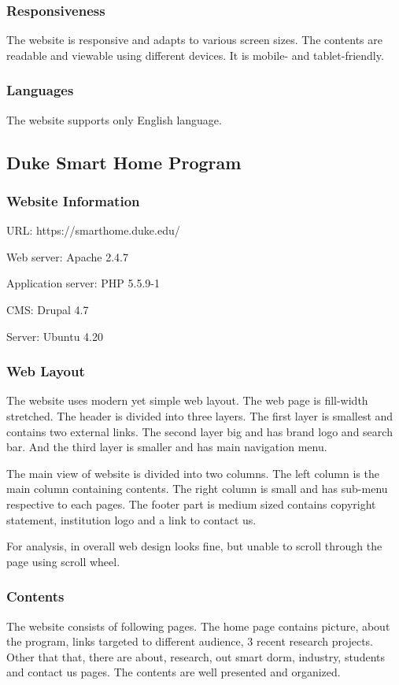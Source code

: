 \subsubsection*{Responsiveness}
The website is responsive and adapts to various screen sizes. The contents are readable and viewable using different devices. It is mobile- and tablet-friendly.

\subsubsection*{Languages}
The website supports only English language.

\subsection{Duke Smart Home Program}
\subsubsection*{Website Information}
\begin{itemize*}
\item URL: https://smarthome.duke.edu/
\item Web server: Apache 2.4.7
\item Application server: PHP 5.5.9-1
\item CMS: Drupal 4.7
\item Server: Ubuntu 4.20
\end{itemize*}

\subsubsection*{Web Layout}
The website \cite{JimGaston.2007} uses modern yet simple web layout. The web page is fill-width stretched. The header is divided into three layers. The first layer is smallest and contains two external links. The second layer big and has brand logo and search bar. And the third layer is smaller and has main navigation menu.

The main view of website is divided into two columns. The left column is the main column containing contents. The right column is small and has sub-menu respective to each pages. The footer part is medium sized contains copyright statement, institution logo and a link to contact us.

For analysis, in overall web design looks fine, but unable to scroll through the page using scroll wheel.

\subsubsection*{Contents}
The website consists of following pages. The home page contains picture, about the program, links targeted to different audience, 3 recent research projects. Other that that, there are about, research, out smart dorm, industry, students and contact us pages. The contents are well presented and organized.

